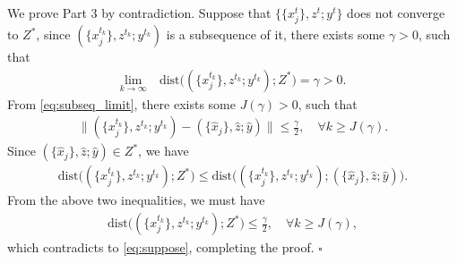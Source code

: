 We prove Part 3 by contradiction.  Suppose that $\{\{x_j^t\}, z^t; y^t\}$ does not converge to $Z^*$, since $(\{x_j^{t_k}\}, z^{t_k}; y^{t_k})$ is a subsequence of it, there exists some $\gamma>0$, such that
\begin{align}
    \underset{k\rightarrow\infty}{\text{lim}}\quad\text{dist}\big((\{x_j^{t_k}\}, z^{t_k}; y^{t_k});Z^*\big)=\gamma>0.\label{eq:suppose}
\end{align}
From \eqref{eq:subseq_limit}, there exists some $J(\gamma)>0$, such that
\begin{align}
        \|(\{x_j^{t_k}\}, z^{t_k}; y^{t_k})- (\{\hat{x}_j\}, \hat{z}; \hat{y})\|\le\frac{\gamma}{2}, \quad\forall k\ge J(\gamma).
\end{align}
Since $(\{\hat{x}_j\}, \hat{z}; \hat{y})\in Z^*$, we have
\begin{align}
    \text{dist}\big((\{x_j^{t_k}\}, z^{t_k}; y^{t_k});Z^*\big) \le \text{dist}\big((\{x_j^{t_k}\}, z^{t_k}; y^{t_k});  (\{\hat{x}_j\}, \hat{z}; \hat{y})\big).
\end{align}
From the above two inequalities, we must have
\begin{align}
    \text{dist}\big((\{x_j^{t_k}\}, z^{t_k}; y^{t_k});Z^*\big)\le\frac{\gamma}{2},\quad\forall k\ge J(\gamma),
\end{align}
which contradicts to \eqref{eq:suppose}, completing the proof.
\hfill$\square$


